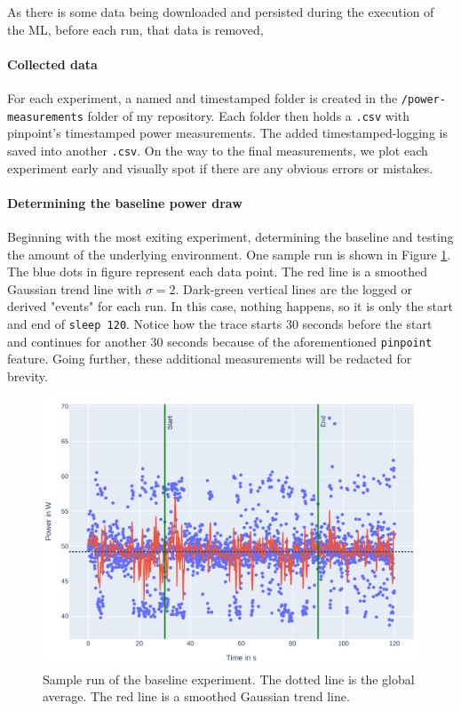 As there is some data being downloaded and persisted during the execution of the ML, before each run, that data is removed,

\paragraph{Collected data}

For each experiment, a named and timestamped folder is created in the \verb|/power-measurements| folder of my repository. Each folder then holds a \verb|.csv| with pinpoint's timestamped power measurements. 
The added timestamped-logging is saved into another \verb|.csv|. 
On the way to the final measurements, we plot each experiment early and visually spot if there are any obvious errors or mistakes.

\paragraph{Determining the baseline power draw}

Beginning with the most exiting experiment, determining the baseline and testing the amount of the underlying environment. 
One sample run is shown in Figure \ref{fig:plot_baseline}.
The blue dots in figure represent each data point. The red line is a smoothed Gaussian trend line with $\sigma = 2$. 
Dark-green vertical lines are the logged or derived "events" for each run. In this case, nothing happens, so it is only the start and end of \verb|sleep 120|. 
Notice how the trace starts 30 seconds before the start and continues for another 30 seconds because of the aforementioned \verb|pinpoint| feature.
Going further, these additional measurements will be redacted for brevity.

\begin{figure}
    \includegraphics[width=\linewidth]{power-measurements/measurements_sleep_0714004033/plot.pdf}
    \caption{Sample run of the baseline experiment. The dotted line is the global average. The red line is a smoothed Gaussian trend line.}
    \label{fig:plot_baseline}
\end{figure}

